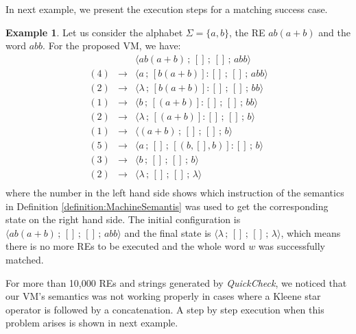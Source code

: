 \documentclass[oneside,12pt]{scrbook}
\theoremstyle{definition}
\newtheorem{Example}{Example}
\theoremstyle{plain}
\theoremstyle{definition}
\begin{document}
In next example, we present the execution steps for a matching success case.

\begin{Example}
	Let us consider the alphabet $\Sigma = \{a, b\}$, the RE $ab (a + b)$ and the word $abb$. For the proposed VM, we have:
	\[
		\begin{array}{rcl}
			& & \langle ab(a+b) \,;\, [] \,;\, [] \,;\, abb \rangle \\
			(4) & \rightarrow & \langle a \,;\, [b(a+b)]:[] \,;\, [] \,;\, abb \rangle \\
			(2) & \rightarrow & \langle \lambda \,;\, [b(a+b)]:[] \,;\, [] \,;\, bb \rangle \\
			(1) & \rightarrow & \langle b \,;\, [(a+b)]:[] \,;\, [] \,;\, bb \rangle \\
			(2) & \rightarrow & \langle \lambda \,;\, [(a+b)]:[] \,;\, [] \,;\, b \rangle \\
			(1) & \rightarrow & \langle (a+b) \,;\, [] \,;\, [] \,;\, b \rangle \\
			(5) & \rightarrow & \langle a \,;\, [] \,;\, [(b,[],b)]:[] \,;\, b \rangle \\
			(3) & \rightarrow & \langle b \,;\, [] \,;\, [] \,;\, b \rangle \\
			(2) & \rightarrow & \langle \lambda \,;\, [] \,;\, [] \,;\, \lambda \rangle \\
		\end{array}
	\]
	where the number in the left hand side shows which instruction of the semantics in Definition \ref{definition:MachineSemantis} was used to get the corresponding state on the right hand side. The initial configuration is $\langle ab(a+b) \,;\, [] \,;\, [] \,;\, abb \rangle$ and the final state is $\langle \lambda \,;\, [] \,;\, [] \,;\, \lambda \rangle$, which means there is no more REs to be executed and the whole word $w$ was successfully matched.
\end{Example}

For more than 10,000 REs and strings generated by \textit{QuickCheck}, we noticed that our VM's semantics was not working properly in cases where a Kleene star operator is followed by a concatenation. A step by step execution when this problem arises is shown in next example.
\end{document}

